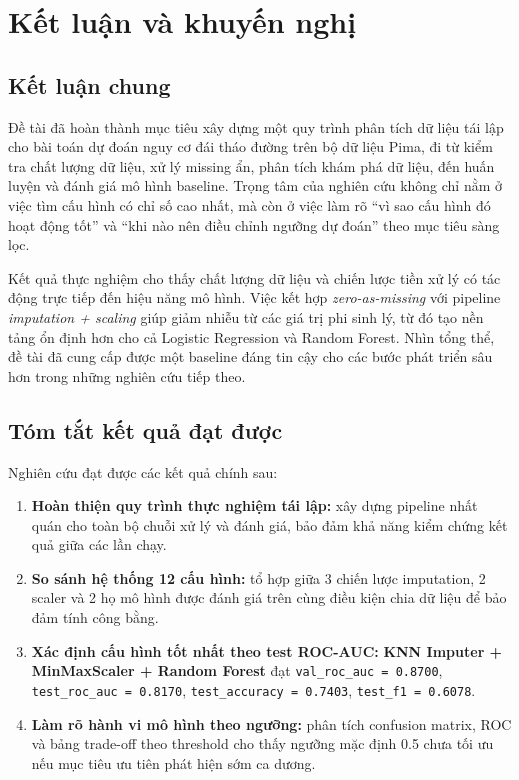 \chapter{Kết luận và khuyến nghị}

\section{Kết luận chung}
Đề tài đã hoàn thành mục tiêu xây dựng một quy trình phân tích dữ liệu tái lập cho bài toán dự đoán nguy cơ đái tháo đường
trên bộ dữ liệu Pima, đi từ kiểm tra chất lượng dữ liệu, xử lý missing ẩn, phân tích khám phá dữ liệu, đến huấn luyện và đánh giá
mô hình baseline. Trọng tâm của nghiên cứu không chỉ nằm ở việc tìm cấu hình có chỉ số cao nhất, mà còn ở việc làm rõ
``vì sao cấu hình đó hoạt động tốt'' và ``khi nào nên điều chỉnh ngưỡng dự đoán'' theo mục tiêu sàng lọc.

Kết quả thực nghiệm cho thấy chất lượng dữ liệu và chiến lược tiền xử lý có tác động trực tiếp đến hiệu năng mô hình.
Việc kết hợp \textit{zero-as-missing} với pipeline \textit{imputation + scaling} giúp giảm nhiễu từ các giá trị phi sinh lý,
từ đó tạo nền tảng ổn định hơn cho cả Logistic Regression và Random Forest. Nhìn tổng thể, đề tài đã cung cấp được một baseline đáng tin cậy
cho các bước phát triển sâu hơn trong những nghiên cứu tiếp theo.

\section{Tóm tắt kết quả đạt được}
Nghiên cứu đạt được các kết quả chính sau:
\begin{enumerate}[leftmargin=1.8em]
    \item \textbf{Hoàn thiện quy trình thực nghiệm tái lập:} xây dựng pipeline nhất quán cho toàn bộ chuỗi xử lý và đánh giá,
    bảo đảm khả năng kiểm chứng kết quả giữa các lần chạy.

    \item \textbf{So sánh hệ thống 12 cấu hình:} tổ hợp giữa 3 chiến lược imputation, 2 scaler và 2 họ mô hình được đánh giá
    trên cùng điều kiện chia dữ liệu để bảo đảm tính công bằng.

    \item \textbf{Xác định cấu hình tốt nhất theo test ROC-AUC:} \textbf{KNN Imputer + MinMaxScaler + Random Forest}
    đạt \texttt{val\_roc\_auc = 0.8700}, \texttt{test\_roc\_auc = 0.8170}, \texttt{test\_accuracy = 0.7403},
    \texttt{test\_f1 = 0.6078}.

    \item \textbf{Làm rõ hành vi mô hình theo ngưỡng:} phân tích confusion matrix, ROC và bảng trade-off theo threshold
    cho thấy ngưỡng mặc định 0.5 chưa tối ưu nếu mục tiêu ưu tiên phát hiện sớm ca dương.
\end{enumerate}

